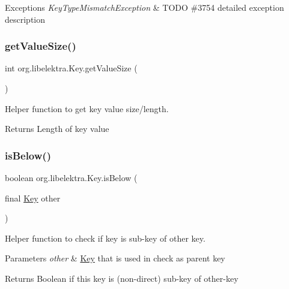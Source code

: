 \begin{DoxyExceptions}{Exceptions}
{\em Key\+Type\+Mismatch\+Exception} & T\+O\+DO \#3754 detailed exception description \\
\hline
\end{DoxyExceptions}
\mbox{\label{classorg_1_1libelektra_1_1Key_aeb1c3e899a17778c8511a08ee0472e43}} 
\subsubsection{\texorpdfstring{get\+Value\+Size()}{getValueSize()}}
{\footnotesize\ttfamily int org.\+libelektra.\+Key.\+get\+Value\+Size (\begin{DoxyParamCaption}{ }\end{DoxyParamCaption})\hspace{0.3cm}{\ttfamily [inline]}}



Helper function to get key value size/length. 

\begin{DoxyReturn}{Returns}
Length of key value 
\end{DoxyReturn}
\mbox{\label{classorg_1_1libelektra_1_1Key_af9a7a7941c07c058f1d4bd6c55e20fe9}} 
\subsubsection{\texorpdfstring{is\+Below()}{isBelow()}}
{\footnotesize\ttfamily boolean org.\+libelektra.\+Key.\+is\+Below (\begin{DoxyParamCaption}\item[{final \hyperlink{classorg_1_1libelektra_1_1Key}{Key}}]{other }\end{DoxyParamCaption})\hspace{0.3cm}{\ttfamily [inline]}}



Helper function to check if key is sub-\/key of other key. 


\begin{DoxyParams}{Parameters}
{\em other} & \hyperlink{classorg_1_1libelektra_1_1Key}{Key} that is used in check as parent key \\
\hline
\end{DoxyParams}
\begin{DoxyReturn}{Returns}
Boolean if this key is (non-\/direct) sub-\/key of other-\/key 
\end{DoxyReturn}
\mbox{\label{classorg_1_1libelektra_1_1Key_ab3143b14824a384ec4b6f9005f6da554}} 
